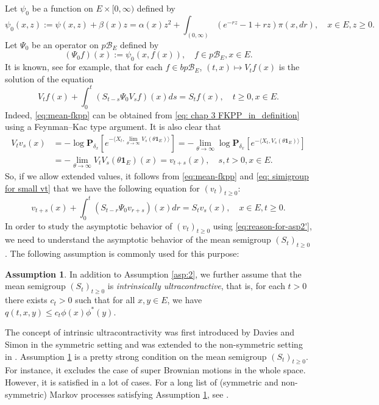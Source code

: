 \documentclass[UTF8]{pkuthss}
\theoremstyle{plain}
\theoremstyle{definition}
\newtheorem{asp}{Assumption}[chapter]
\numberwithin{equation}{section}
\begin{document}
	Let $\psi_0$ be a function on $E\times[0,\infty)$ defined by
\[
	\psi_0(x,z)
	:= \psi(x,z) + \beta(x)z
	= \alpha(x)z^2 + \int_{(0,\infty)}(e^{-rz}-1+rz) \pi(x,dr),
	\quad x\in E, z\geq 0.
\] 
	Let $\Psi_0$ be an operator on $p\mathscr B_E$ defined by
\[
	(\Psi_0 f)(x)
	:= \psi_0(x,f(x)),
	\quad f\in p\mathscr B_E, x\in E.
\]
	It is known, see \cite[Theorem 2.23]{Li2011Measure-valued} for example, that for each $f\in bp\mathscr B_E$, $(t,x) \mapsto V_tf(x)$ is the solution of the equation
\begin{equation}
\label{eq:mean-fkpp}
	V_t f(x) + \int_0^t (S_{t-s}\Psi_0 V_s f)(x) ds
	= S_t f(x),\quad t\geq 0, x\in E.
\end{equation}
	Indeed, \eqref{eq:mean-fkpp} can be obtained from \eqref{eq: chap 3 FKPP_in_definition} using a Feynman–Kac type  argument.
	It is also clear that
\begin{align}\label{eq: simigroup for small vt}
	V_t v_s(x)
	&= -\log \mathbf P_{\delta_x}[e^{-\langle X_t,\lim_{\theta\to\infty } V_s(\theta \mathbf 1_E)\rangle}]
	= -\lim_{\theta \to \infty} \log \mathbf P_{\delta_x}[e^{-\langle X_t, V_s(\theta \mathbf 1_E)\rangle}]\\
	&= - \lim_{\theta\to\infty} V_t V_s(\theta \mathbf 1_E)(x)
	= v_{t+s}(x),
	\quad s,t>0, x\in E.
\end{align}
	So, if we allow extended values, it follows from  \eqref{eq:mean-fkpp} and \eqref{eq: simigroup for small vt} that we have the following equation for $(v_t)_{t\geq 0}$:
\begin{equation}\label{eq:reason-for-asp2'}
	v_{t+s}(x) + \int_0^t  (S_{t-r} \Psi_0 v_{r+s})(x)  dr
	= S_tv_s(x),
	\quad x\in E,t\geq 0.
\end{equation}
	 In order to study the asymptotic behavior of $(v_t)_{t\geq 0}$ using \eqref{eq:reason-for-asp2'},
	we need to understand the asymptotic behavior of the mean semigroup $(S_t)_{t\geq 0}$. The following assumption is commonly used for this purpose:
\begin{asp}
\label{asp:2'}
	In addition to Assumption \ref{asp:2}, we further assume that the mean semigroup $(S_t)_{t\geq 0}$ is \emph{intrinsically ultracontractive},
	that is, for each $t>0$ there exists $c_t>0$ such that for all $x,y\in E$, we have $q(t,x,y)\leq c_t\phi(x)\phi^*(y)$.
\end{asp}
	

		The concept of intrinsic ultracontractivity was first introduced by Davies and Simon \cite{DaviesSimon1984Ultracontractivity} in the symmetric setting and was extended to the non-symmetric setting in \cite{KimSong2008Intrinsic}.  Assumption 	\ref{asp:2'} is a pretty strong condition on the mean semigroup $(S_t)_{t\geq 0}$. For instance, it excludes the case of super Brownian motions in the whole space. However, it is satisfied in a lot of cases.
	For a long list of (symmetric and non-symmetric) Markov processes satisfying Assumption \ref{asp:2'}, see \cite{RenSongZhang2015Limit}.
\end{document}
